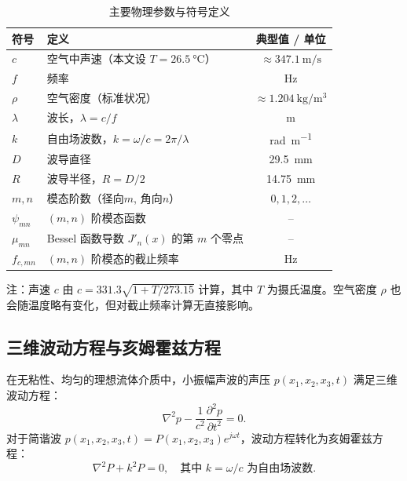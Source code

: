 \documentclass[12pt,a4paper]{article}
\begin{document}
\begin{table}[h!]
    \centering
    \caption{主要物理参数与符号定义}\label{tab:param}
    \begin{tabular}{llc}
        \toprule
        符号 & 定义 & 典型值 / 单位 \\
        \midrule
        $c$     & 空气中声速（本文设 $T=\SI{26.5}{\celsius}$） & $\approx \SI{347.1}{\meter\per\second}$ \\ %
        $f$     & 频率 & \si{\hertz} \\
        $\rho$   & 空气密度（标准状况） & $\approx \SI{1.204}{\kilo\gram\per\cubic\meter}$ \\ %
        $\lambda$ & 波长，$\lambda = c/f$ & \si{\meter} \\
        $k$     & 自由场波数，$k = \omega/c = 2\pi/\lambda$ & \si{\radian\per\meter} \\
        $D$     & 波导直径 & \SI{29.5}{\milli\meter} \\
        $R$     & 波导半径，$R = D/2$ & \SI{14.75}{\milli\meter} \\
        $m,n$   & 模态阶数（径向$m$, 角向$n$） & $0,1,2,\dots$ \\
        $\psi_{mn}$ & $(m,n)$ 阶模态函数 & -- \\
        $\mu_{mn}$  & Bessel 函数导数 $J'_n(x)$ 的第 $m$ 个零点 & -- \\
        $f_{c,mn}$ & $(m,n)$ 阶模态的截止频率 & \si{\hertz} \\
        \bottomrule
    \end{tabular}
\end{table}
注：声速 $c$ 由 $c = 331.3 \sqrt{1 + T/273.15}$ 计算，其中 $T$ 为摄氏温度。空气密度 $\rho$ 也会随温度略有变化，但对截止频率计算无直接影响。

\subsection{三维波动方程与亥姆霍兹方程}
在无粘性、均匀的理想流体介质中，小振幅声波的声压 $p(x_1,x_2,x_3,t)$ 满足三维波动方程：
\begin{equation}
    \nabla^{2} p - \frac{1}{c^{2}}\frac{\partial^{2}p}{\partial t^{2}} = 0.
    \label{eq:wave3d}
\end{equation}
对于简谐波 $p(x_1,x_2,x_3,t) = P(x_1,x_2,x_3)e^{j\omega t}$，波动方程转化为亥姆霍兹方程：
\begin{equation}
    \nabla^{2} P + k^2 P = 0, \quad \text{其中 } k = \omega/c \text{ 为自由场波数.}
    \label{eq:helmholtz}
\end{equation}
\end{document}
